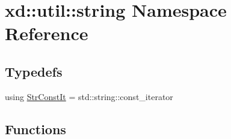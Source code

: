 \hypertarget{namespacexd_1_1util_1_1string}{}\section{xd\+:\+:util\+:\+:string Namespace Reference}
\label{namespacexd_1_1util_1_1string}
\subsection*{Typedefs}
\begin{DoxyCompactItemize}
\item 
using \mbox{\hyperlink{namespacexd_1_1util_1_1string_abf396256ffbe263d811f20c7e3e03e5d}{Str\+Const\+It}} = std\+::string\+::const\+\_\+iterator
\end{DoxyCompactItemize}
\subsection*{Functions}
